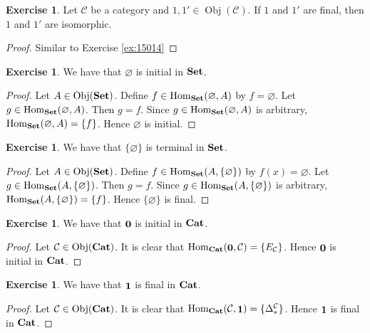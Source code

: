 \documentclass{book}
\theoremstyle{definition}
\newtheorem{ex}[definition]{Exercise}
\newcommand{\Del}{\Delta}
\newcommand{\MC}{\mathcal{C}}
\newcommand{\lex}[1]{\label{ex:#1}}
\newcommand{\rex}[1]{Exercise \ref{ex:#1}}
\DeclareMathOperator{\Obj}{Obj}
\DeclareMathOperator{\Hom}{Hom}
\DeclareMathOperator*{\Set}{\text{\tbf{Set}}}
\DeclareMathOperator*{\Cat}{\text{\tbf{Cat}}}
\DeclareMathOperator*{\0}{\mbf{0}}
\DeclareMathOperator*{\1}{\mbf{1}}
\newcommand{\tbf}[1]{\textbf{#1}}
\begin{document}
	\begin{ex} \lex{15014.1}
		Let $\MC$ be a category and $1, 1' \in \Obj(\MC)$. If $1$ and $1'$ are final, then $1$ and $1'$ are isomorphic.
	\end{ex}
	
	\begin{proof}
		Similar to \rex{15014}
	\end{proof}
	
	\begin{ex} \lex{15015}
		We have that $\varnothing$ is initial in $\Set$. 
	\end{ex}
	
	\begin{proof}
		Let $A \in \Obj(\Set)$. Define $f \in \Hom_{\Set}(\varnothing, A)$ by $f = \varnothing$. Let $g \in \Hom_{\Set}(\varnothing, A)$. Then $g = f$. Since $g \in \Hom_{\Set}(\varnothing, A)$ is arbitrary, $\Hom_{\Set}(\varnothing, A) = \{f\}$. Hence $\varnothing$ is initial.
	\end{proof}

	\begin{ex} \lex{15015.1}
		We have that $ \{\varnothing\}$  is terminal in $\Set$. 
	\end{ex}
	
	\begin{proof}
		Let $A \in \Obj(\Set)$. Define $f \in \Hom_{\Set}(A, \{\varnothing\})$ by $f(x) = \varnothing$. Let $g \in \Hom_{\Set}(A, \{\varnothing\})$. Then $g = f$. Since $g \in \Hom_{\Set}(A, \{\varnothing\})$ is arbitrary, $\Hom_{\Set}(A, \{\varnothing\}) = \{f\}$. Hence $\{\varnothing\}$ is final.
	\end{proof}
	
	\begin{ex} \lex{15016}
		We have that $\0$ is initial in $\Cat$. 
	\end{ex}

	\begin{proof}
		Let $\MC \in \Obj(\Cat)$. It is clear that $\Hom_{\Cat}(\0, \MC) = \{E_\MC\}$. Hence $\0$ is initial in $\Cat$.
	\end{proof}

	\begin{ex} \lex{15016.1}
		We have that $\1$ is final in $\Cat$. 
	\end{ex}
	
	\begin{proof}
		Let $\MC \in \Obj(\Cat)$. It is clear that $\Hom_{\Cat}(\MC, \1) = \{ \Del^{\MC}_* \}$. Hence $\1$ is final in $\Cat$.
	\end{proof}
\end{document}
